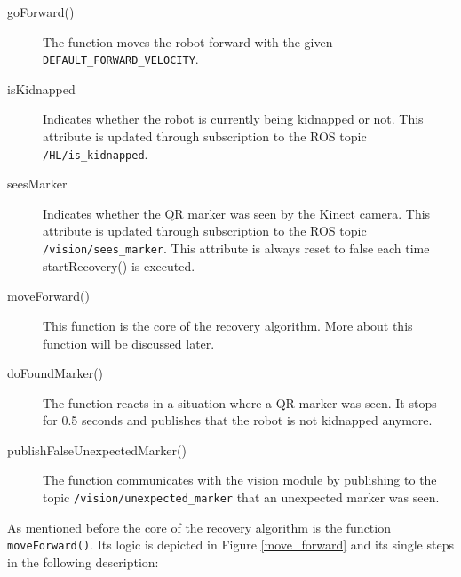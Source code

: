 \begin{description}
\item[goForward()] The function moves the robot forward with the given \texttt{DEFAULT\_FORWARD\_VELOCITY}.

\item[isKidnapped] Indicates whether the robot is currently being kidnapped or not. This attribute is updated through subscription to the ROS topic \texttt{/HL/is\_kidnapped}.

\item[seesMarker] Indicates whether the QR marker was seen by the Kinect camera. This attribute is updated through subscription to the ROS topic \texttt{/vision/sees\_marker}. This attribute is always reset to false each time startRecovery() is executed.

\item[moveForward()] This function is the core of the recovery algorithm. More about this function will be discussed later.

\item[doFoundMarker()] The function reacts in a situation where a QR marker was seen. It stops for 0.5 seconds and publishes that the robot is not kidnapped anymore.

\item[publishFalseUnexpectedMarker()] The function communicates with the vision module by publishing to the topic \texttt{/vision/unexpected\_marker} that an unexpected marker was seen.
\end{description}







As mentioned before the core of the recovery algorithm is the function \texttt{moveForward()}. Its logic is depicted in Figure \ref{move_forward} and its single steps in the following description:

